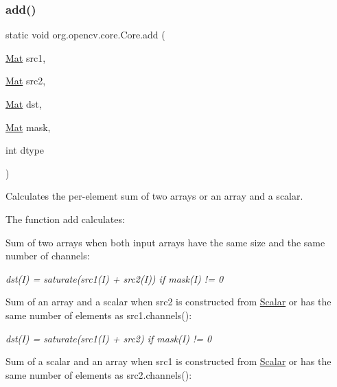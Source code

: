 \subsubsection{\texorpdfstring{add()}{add()}\hspace{0.1cm}{\footnotesize\ttfamily [1/6]}}
{\footnotesize\ttfamily static void org.\+opencv.\+core.\+Core.\+add (\begin{DoxyParamCaption}\item[{\mbox{\hyperlink{classorg_1_1opencv_1_1core_1_1_mat}{Mat}}}]{src1,  }\item[{\mbox{\hyperlink{classorg_1_1opencv_1_1core_1_1_mat}{Mat}}}]{src2,  }\item[{\mbox{\hyperlink{classorg_1_1opencv_1_1core_1_1_mat}{Mat}}}]{dst,  }\item[{\mbox{\hyperlink{classorg_1_1opencv_1_1core_1_1_mat}{Mat}}}]{mask,  }\item[{int}]{dtype }\end{DoxyParamCaption})\hspace{0.3cm}{\ttfamily [static]}}

Calculates the per-\/element sum of two arrays or an array and a scalar.

The function {\ttfamily add} calculates\+:


\begin{DoxyItemize}
\item Sum of two arrays when both input arrays have the same size and the same number of channels\+: 
\end{DoxyItemize}

{\itshape dst(\+I) = saturate(src1(\+I) + src2(\+I)) if mask(\+I) != 0}


\begin{DoxyItemize}
\item Sum of an array and a scalar when {\ttfamily src2} is constructed from {\ttfamily \mbox{\hyperlink{classorg_1_1opencv_1_1core_1_1_scalar}{Scalar}}} or has the same number of elements as {\ttfamily src1.\+channels()}\+: 
\end{DoxyItemize}

{\itshape dst(\+I) = saturate(src1(\+I) + src2) if mask(\+I) != 0}


\begin{DoxyItemize}
\item Sum of a scalar and an array when {\ttfamily src1} is constructed from {\ttfamily \mbox{\hyperlink{classorg_1_1opencv_1_1core_1_1_scalar}{Scalar}}} or has the same number of elements as {\ttfamily src2.\+channels()}\+: 
\end{DoxyItemize}

